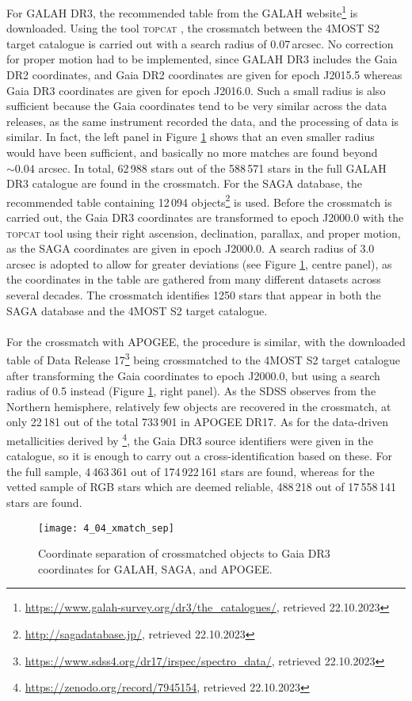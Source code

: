 \documentclass[a4paper,11pt]{article}
\begin{document}
For GALAH DR3, the recommended table from the GALAH website\footnote{\url{https://www.galah-survey.org/dr3/the_catalogues/}, retrieved 22.10.2023} is downloaded. Using the tool \textsc{topcat} \citep{topcat}, the crossmatch between the 4MOST S2 target catalogue is carried out with a search radius of 0.07\,arcsec. No correction for proper motion had to be implemented, since GALAH DR3 includes the Gaia DR2 coordinates, and Gaia DR2 coordinates are given for epoch J2015.5 whereas Gaia DR3 coordinates are given for epoch J2016.0. Such a small radius is also sufficient because the Gaia coordinates tend to be very similar across the data releases, as the same instrument recorded the data, and the processing of data is similar. In fact, the left panel in Figure \ref{fig:xmatch_sep} shows that an even smaller radius would have been sufficient, and basically no more matches are found beyond ${\sim}0.04$ arcsec. In total, 62\,988 stars out of the 588\,571 stars in the full GALAH DR3 catalogue are found in the crossmatch. For the SAGA database, the recommended table containing 12\,094 objects\footnote{\url{http://sagadatabase.jp/}, retrieved 22.10.2023} is used. Before the crossmatch is carried out, the Gaia DR3 coordinates are transformed to epoch J2000.0 with the \textsc{topcat} tool using their right ascension, declination, parallax, and proper motion, as the SAGA coordinates are given in epoch J2000.0. A search radius of 3.0 arcsec is adopted to allow for greater deviations (see Figure \ref{fig:xmatch_sep}, centre panel), as the coordinates in the table are gathered from many different datasets across several decades. The crossmatch identifies 1250 stars that appear in both the SAGA database and the 4MOST S2 target catalogue.\\ \\
%
For the crossmatch with APOGEE, the procedure is similar, with the downloaded table of Data Release 17\footnote{\url{https://www.sdss4.org/dr17/irspec/spectro_data/}, retrieved 22.10.2023} being crossmatched to the 4MOST S2 target catalogue after transforming the Gaia coordinates to epoch J2000.0, but using a search radius of 0.5 instead (Figure \ref{fig:xmatch_sep}, right panel). As the SDSS observes from the Northern hemisphere, relatively few objects are recovered in the crossmatch, at only 22\,181 out of the total 733\,901 in APOGEE DR17. As for the data-driven metallicities derived by \citet{andrae23}\footnote{\url{https://zenodo.org/record/7945154}, retrieved 22.10.2023}, the Gaia DR3 source identifiers were given in the catalogue, so it is enough to carry out a cross-identification based on these. For the full sample, 4\,463\,361 out of 174\,922\,161 stars are found, whereas for the vetted sample of RGB stars which are deemed reliable, 488\,218 out of 17\,558\,141 stars are found.
%
\begin{figure}
 \centering
 \texttt{[image: 4\_04\_xmatch\_sep]}
 \caption[Coordinate separation for crossmatches]{Coordinate separation of crossmatched objects to Gaia DR3 coordinates for GALAH, SAGA, and APOGEE.}
 \label{fig:xmatch_sep}
\end{figure}
%
\end{document}
